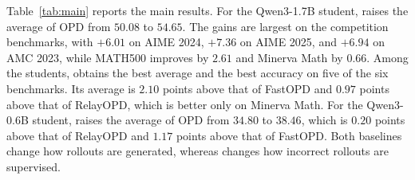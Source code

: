 Table~\ref{tab:main} reports the main results.
For the Qwen3-1.7B student, \ours{} raises the average of OPD from $50.08$ to
$54.65$.
The gains are largest on the competition benchmarks, with $+6.01$ on AIME 2024,
$+7.36$ on AIME 2025, and $+6.94$ on AMC 2023, while MATH500 improves by $2.61$
and Minerva Math by $0.66$.
Among the students, \ours{} obtains the best average and the best accuracy on
five of the six benchmarks.
Its average is $2.10$ points above that of FastOPD and $0.97$ points above that of RelayOPD, which is better only on Minerva Math.
For the Qwen3-0.6B student, \ours{} raises the average of OPD from $34.80$ to $38.46$, which is $0.20$ points above that of RelayOPD and $1.17$ points above that of FastOPD.
Both baselines change how rollouts are generated, whereas \ours{} changes how
incorrect rollouts are supervised.
